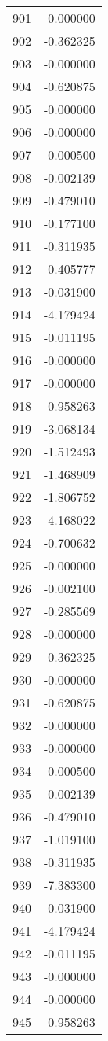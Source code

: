 \documentclass[12pt]{article}
\begin{document}
\begin{longtable}{@{}cc@{}}
901 & -0.000000 \\
902 & -0.362325 \\
903 & -0.000000 \\
904 & -0.620875 \\
905 & -0.000000 \\
906 & -0.000000 \\
907 & -0.000500 \\
908 & -0.002139 \\
909 & -0.479010 \\
910 & -0.177100 \\
911 & -0.311935 \\
912 & -0.405777 \\
913 & -0.031900 \\
914 & -4.179424 \\
915 & -0.011195 \\
916 & -0.000000 \\
917 & -0.000000 \\
918 & -0.958263 \\
919 & -3.068134 \\
920 & -1.512493 \\
921 & -1.468909 \\
922 & -1.806752 \\
923 & -4.168022 \\
924 & -0.700632 \\
925 & -0.000000 \\
926 & -0.002100 \\
927 & -0.285569 \\
928 & -0.000000 \\
929 & -0.362325 \\
930 & -0.000000 \\
931 & -0.620875 \\
932 & -0.000000 \\
933 & -0.000000 \\
934 & -0.000500 \\
935 & -0.002139 \\
936 & -0.479010 \\
937 & -1.019100 \\
938 & -0.311935 \\
939 & -7.383300 \\
940 & -0.031900 \\
941 & -4.179424 \\
942 & -0.011195 \\
943 & -0.000000 \\
944 & -0.000000 \\
945 & -0.958263 \\

\end{longtable}
\end{document}
